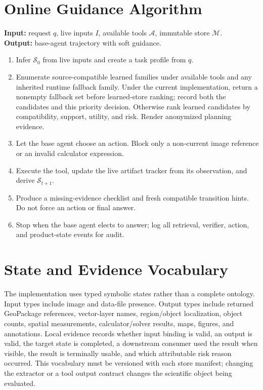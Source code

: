 \documentclass[10pt]{article}
\newcommand{\state}{\mathcal{S}}
\begin{document}
\section{Online Guidance Algorithm}
\noindent\textbf{Input:} request $q$, live inputs $I$, available tools $\mathcal{A}$, immutable store $\mathcal{M}$.\\
\textbf{Output:} base-agent trajectory with soft guidance.\\
\begin{enumerate}
\item Infer $\state_0$ from live inputs and create a task profile from $q$.
\item Enumerate source-compatible learned families under available tools and any inherited runtime fallback family. Under the current implementation, return a nonempty fallback set before learned-store ranking; record both the candidates and this priority decision. Otherwise rank learned candidates by compatibility, support, utility, and risk. Render anonymized planning evidence.
\item Let the base agent choose an action. Block only a non-current image reference or an invalid calculator expression.
\item Execute the tool, update the live artifact tracker from its observation, and derive $\state_{t+1}$.
\item Produce a missing-evidence checklist and fresh compatible transition hints. Do not force an action or final answer.
\item Stop when the base agent elects to answer; log all retrieval, verifier, action, and product-state events for audit.
\end{enumerate}

\section{State and Evidence Vocabulary}
The implementation uses typed symbolic states rather than a complete ontology. Input types include image and data-file presence. Output types include returned GeoPackage references, vector-layer names, region/object localization, object counts, spatial measurements, calculator/solver results, maps, figures, and annotations. Local evidence records whether input binding is valid, an output is valid, the target state is completed, a downstream consumer used the result when visible, the result is terminally usable, and which attributable risk reason occurred. This vocabulary must be versioned with each store manifest; changing the extractor or a tool output contract changes the scientific object being evaluated.
\end{document}
